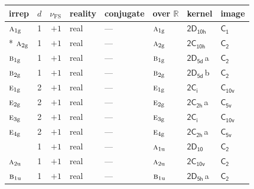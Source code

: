 \documentclass[10pt,a4paper]{article}
\numberwithin{equation}{section}
\newcommand{\grp}[1]{\mathsf{#1}}
\newcommand{\irr}[1]{\text{\normalfont\scshape #1}}
\newcommand{\detbox}[1]{{\setlength{\fboxsep}{1pt}\fbox{#1}}}
\newcommand{\ptag}[1]{\mathrm{#1}}
\newcommand{\clsletter}[1]{\,{\scriptsize\color{black!55}#1}}
\newcommand{\fsind}{\nu_{\mathrm{FS}}}
\begin{document}
\setlength{\emergencystretch}{2em}\par\setlength{\emergencystretch}{0pt}
{\small\renewcommand{\arraystretch}{1.25}\setlength{\tabcolsep}{4pt}\begin{longtable}{@{}lrrlllll@{}}\toprule
irrep & $d$ & $\fsind$ & reality & conjugate & over $\mathbb{R}$ & kernel & image\\\midrule\endhead
\bottomrule\endfoot\endlastfoot
$\irr{a}_{1\ptag{g}}$ & 1 & $+1$ & real & --- & $\irr{a}_{1\ptag{g}}$ & \href{2D10h.pdf}{$\grp{2D_{10h}}$} & \href{../../../rotation/data/pdf/C1.pdf}{$\grp{C_{1}}$}\\*
$\irr{a}_{2\ptag{g}}$ & 1 & $+1$ & real & --- & $\irr{a}_{2\ptag{g}}$ & \href{2C10h.pdf}{$\grp{2C_{10h}}$} & \href{../../../rotation/data/pdf/C2.pdf}{$\grp{C_{2}}$}\\
$\irr{b}_{1\ptag{g}}$ & 1 & $+1$ & real & --- & $\irr{b}_{1\ptag{g}}$ & \href{2D5d.pdf}{$\grp{2D_{5d}}$}\clsletter{a} & \href{../../../rotation/data/pdf/C2.pdf}{$\grp{C_{2}}$}\\
$\irr{b}_{2\ptag{g}}$ & 1 & $+1$ & real & --- & $\irr{b}_{2\ptag{g}}$ & \href{2D5d.pdf}{$\grp{2D_{5d}}$}\clsletter{b} & \href{../../../rotation/data/pdf/C2.pdf}{$\grp{C_{2}}$}\\
$\irr{e}_{1\ptag{g}}$ & 2 & $+1$ & real & --- & $\irr{e}_{1\ptag{g}}$ & \href{2S2.pdf}{$\grp{2C_{i}}$} & \href{../../../rotation/data/pdf/C10v.pdf}{$\grp{C_{10v}}$}\\
$\irr{e}_{2\ptag{g}}$ & 2 & $+1$ & real & --- & $\irr{e}_{2\ptag{g}}$ & \href{2C2h.pdf}{$\grp{2C_{2h}}$}\clsletter{a} & \href{../../../rotation/data/pdf/C5v.pdf}{$\grp{C_{5v}}$}\\
$\irr{e}_{3\ptag{g}}$ & 2 & $+1$ & real & --- & $\irr{e}_{3\ptag{g}}$ & \href{2S2.pdf}{$\grp{2C_{i}}$} & \href{../../../rotation/data/pdf/C10v.pdf}{$\grp{C_{10v}}$}\\
$\irr{e}_{4\ptag{g}}$ & 2 & $+1$ & real & --- & $\irr{e}_{4\ptag{g}}$ & \href{2C2h.pdf}{$\grp{2C_{2h}}$}\clsletter{a} & \href{../../../rotation/data/pdf/C5v.pdf}{$\grp{C_{5v}}$}\\
\detbox{$\irr{a}_{1\ptag{u}}$} & 1 & $+1$ & real & --- & $\irr{a}_{1\ptag{u}}$ & \href{2D10.pdf}{$\grp{2D_{10}}$} & \href{../../../rotation/data/pdf/C2.pdf}{$\grp{C_{2}}$}\\
$\irr{a}_{2\ptag{u}}$ & 1 & $+1$ & real & --- & $\irr{a}_{2\ptag{u}}$ & \href{2C10v.pdf}{$\grp{2C_{10v}}$} & \href{../../../rotation/data/pdf/C2.pdf}{$\grp{C_{2}}$}\\
$\irr{b}_{1\ptag{u}}$ & 1 & $+1$ & real & --- & $\irr{b}_{1\ptag{u}}$ & \href{2D5h.pdf}{$\grp{2D_{5h}}$}\clsletter{a} & \href{../../../rotation/data/pdf/C2.pdf}{$\grp{C_{2}}$}\\

\end{longtable}}
\end{document}
